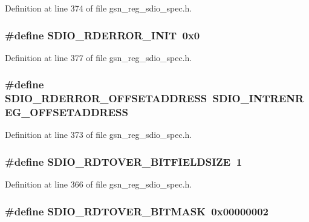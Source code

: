 Definition at line 374 of file gsn\_\-reg\_\-sdio\_\-spec.h.

\hypertarget{a00571_a68d178cd1daa83cdc41b52bd9c3beead}{
\subsubsection[{SDIO\_\-RDERROR\_\-INIT}]{\setlength{\rightskip}{0pt plus 5cm}\#define SDIO\_\-RDERROR\_\-INIT~0x0}}
\label{a00571_a68d178cd1daa83cdc41b52bd9c3beead}


Definition at line 377 of file gsn\_\-reg\_\-sdio\_\-spec.h.

\hypertarget{a00571_a79bb6e96d4a04313587b0eda4b4518e3}{
\subsubsection[{SDIO\_\-RDERROR\_\-OFFSETADDRESS}]{\setlength{\rightskip}{0pt plus 5cm}\#define SDIO\_\-RDERROR\_\-OFFSETADDRESS~SDIO\_\-INTRENREG\_\-OFFSETADDRESS}}
\label{a00571_a79bb6e96d4a04313587b0eda4b4518e3}


Definition at line 373 of file gsn\_\-reg\_\-sdio\_\-spec.h.

\hypertarget{a00571_a56361d6a599dbf0fbfb36d98e3b2fb20}{
\subsubsection[{SDIO\_\-RDTOVER\_\-BITFIELDSIZE}]{\setlength{\rightskip}{0pt plus 5cm}\#define SDIO\_\-RDTOVER\_\-BITFIELDSIZE~1}}
\label{a00571_a56361d6a599dbf0fbfb36d98e3b2fb20}


Definition at line 366 of file gsn\_\-reg\_\-sdio\_\-spec.h.

\hypertarget{a00571_ad9ada51601a79139158d5f7690c15e4f}{
\subsubsection[{SDIO\_\-RDTOVER\_\-BITMASK}]{\setlength{\rightskip}{0pt plus 5cm}\#define SDIO\_\-RDTOVER\_\-BITMASK~0x00000002}}
\label{a00571_ad9ada51601a79139158d5f7690c15e4f}


